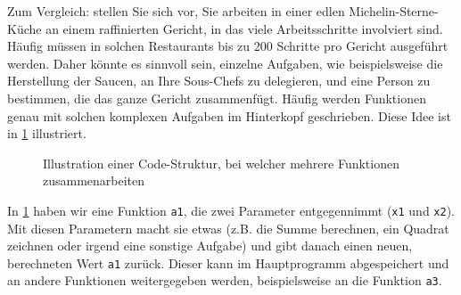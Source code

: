 Zum Vergleich: stellen Sie sich vor, Sie arbeiten in einer edlen Michelin-Sterne-Küche an einem raffinierten Gericht, in das viele Arbeitsschritte involviert sind. Häufig müssen in solchen Restaurants bis zu 200 Schritte pro Gericht ausgeführt werden. Daher könnte es sinnvoll sein, einzelne Aufgaben, wie beispielsweise die Herstellung der Saucen, an Ihre Sous-Chefs zu delegieren, und eine Person zu bestimmen, die das ganze Gericht zusammenfügt. Häufig werden Funktionen genau mit solchen komplexen Aufgaben im Hinterkopf geschrieben. Diese Idee ist in \cref{fig:funktionen-mehrere} illustriert.

\begin{figure}[H]
\centering
{}
\caption{Illustration einer Code-Struktur, bei welcher mehrere Funktionen zusammenarbeiten}
\label{fig:funktionen-mehrere}
\end{figure}

In \cref{fig:funktionen-mehrere} haben wir eine Funktion \lstinline|a1|, die zwei Parameter entgegennimmt (\lstinline|x1| und \lstinline|x2|). Mit diesen Parametern macht sie etwas (z.B. die Summe berechnen, ein Quadrat zeichnen oder irgend eine sonstige Aufgabe) und gibt danach einen neuen, berechneten Wert \lstinline|a1| zurück. Dieser kann im Hauptprogramm abgespeichert und an andere Funktionen weitergegeben werden, beispielsweise an die Funktion \lstinline|a3|.


